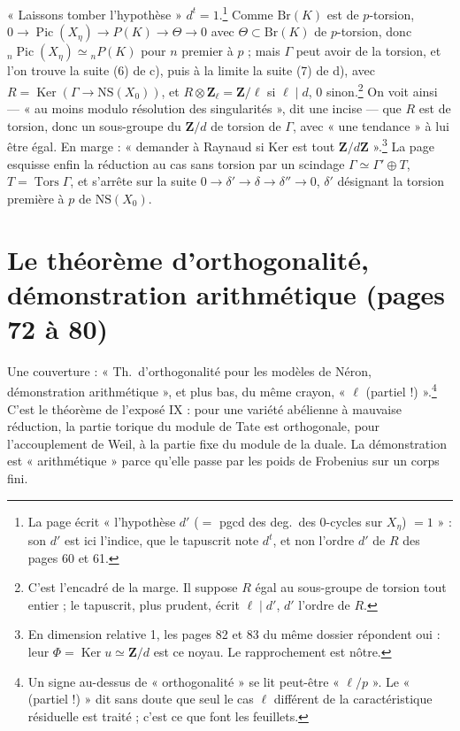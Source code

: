 \documentclass[11pt,a4paper]{article}
\begin{document}
« Laissons tomber l'hypothèse » $d^t = 1$.\footnote{La page écrit « l'hypothèse $d'$ ($=$ pgcd des deg.\ des $0$-cycles sur $X_\eta$) $= 1$ » : son $d'$ est ici l'indice, que le tapuscrit note $d^t$, et non l'ordre $d'$ de $R$ des pages 60 et 61.} Comme $\mathrm{Br}(K)$ est de
$p$-torsion, $0 \to \operatorname{Pic}(X_\eta) \to P(K) \to \Theta \to 0$ avec
$\Theta \subset \mathrm{Br}(K)$ de $p$-torsion, donc ${}_n\operatorname{Pic}(X_\eta)
\simeq {}_nP(K)$ pour $n$ premier à $p$ ; mais $\Gamma$ peut avoir de la torsion,
et l'on trouve la suite (6) de c), puis à la limite la suite (7) de d), avec $R =
\operatorname{Ker}(\Gamma \to \mathrm{NS}(X_0))$, et $R \otimes \mathbf{Z}_\ell =
\mathbf{Z}/\ell$ si $\ell \mid d$, $0$ sinon.\footnote{C'est l'encadré de la
marge. Il suppose $R$ égal au sous-groupe de torsion tout entier ; le tapuscrit,
plus prudent, écrit $\ell \mid d'$, $d'$ l'ordre de $R$.} On voit ainsi --- « au
moins modulo résolution des singularités », dit une incise --- que $R$ est de
torsion, donc un sous-groupe du $\mathbf{Z}/d$ de torsion de $\Gamma$, avec « une
tendance » à lui être égal. En marge : « demander à Raynaud si Ker est tout
$\mathbf{Z}/d\mathbf{Z}$ ».\footnote{En dimension relative 1, les pages 82 et 83
du même dossier répondent oui : leur $\Phi = \operatorname{Ker} u \simeq
\mathbf{Z}/d$ est ce noyau. Le rapprochement est nôtre.} La page esquisse enfin
la réduction au cas sans torsion par un scindage $\Gamma \simeq \Gamma' \oplus T$,
$T = \operatorname{Tors}\Gamma$, et s'arrête sur la suite $0 \to \delta' \to
\delta \to \delta'' \to 0$, $\delta'$ désignant la torsion première à $p$ de
$\mathrm{NS}(X_0)$.

\section*{Le théorème d'orthogonalité, démonstration arithmétique (pages 72 à 80)}

Une couverture : « Th.\ d'orthogonalité pour les modèles de Néron, démonstration
arithmétique », et plus bas, du même crayon, « $\ell$ (partiel !) ».\footnote{Un
signe au-dessus de « orthogonalité » se lit peut-être « $\ell/p$ ». Le
« (partiel !) » dit sans doute que seul le cas $\ell$ différent de la
caractéristique résiduelle est traité ; c'est ce que font les feuillets.} C'est
le théorème de l'exposé IX : pour une variété abélienne à mauvaise réduction, la
partie torique du module de Tate est orthogonale, pour l'accouplement de Weil, à
la partie fixe du module de la duale. La démonstration est « arithmétique » parce
qu'elle passe par les poids de Frobenius sur un corps fini.
\end{document}
